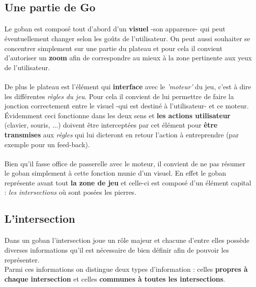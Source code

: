         \subsection{Une partie de Go}
            \paragraph{}Le goban est composé tout d'abord d'un \textbf{visuel} -son apparence- qui peut éventuellement changer selon les goûts de l'utilisateur. On peut aussi souhaiter se concentrer simplement sur une partie du plateau et pour cela il convient d'autoriser un \textbf{zoom} afin de correspondre au mieux à la zone pertinente aux yeux de l'utilisateur.   
            
        	\paragraph{}De plus le plateau est l'élément qui \textbf{interface} avec le \textit{'moteur'} du jeu, c’est à dire les différentes \textit{règles du jeu}. Pour cela il convient de lui permettre de faire la jonction correctement entre le visuel -qui est destiné à l'utilisateur- et ce moteur. Évidemment ceci fonctionne dans les deux sens et \textbf{les actions utilisateur} (clavier, souris, ...) doivent être interceptées par cet élément pour \textbf{être transmises} aux \textit{règles} qui lui dicteront en retour l'action à entreprendre (par exemple pour un feed-back).
        	
        	\paragraph{}Bien qu'il fasse office de passerelle avec le moteur, il convient de ne pas résumer le goban simplement à cette fonction munie d'un visuel. En effet le goban représente avant tout \textbf{la zone de jeu} et celle-ci est composé d'un élément capital : \textit{les intersections} où sont posées les pierres.
        	
    	\subsection{L'intersection}
    	    \paragraph{}Dans un goban l'intersection joue un rôle majeur et chacune d'entre elles possède diverses informations qu'il est nécessaire de bien définir afin de pouvoir les représenter. \\
        	Parmi ces informations on distingue deux types d'information : celles \textbf{propres à chaque intersection} et celles \textbf{communes à toutes les intersections}.      
        	
